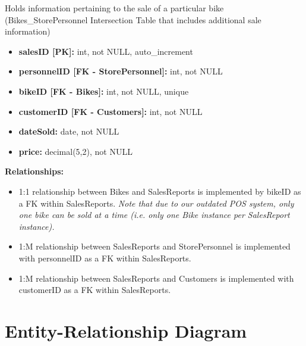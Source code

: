 \documentclass{article}
\begin{document}
\vspace{0.5cm}

\begin{tcolorbox}[colback=secondarycolor, colframe=primarycolor, title=\textbf{SalesReports Table}]
Holds information pertaining to the sale of a particular bike (Bikes\_StorePersonnel Intersection Table that includes additional sale information)
\vspace{0.2cm}

\begin{itemize}
  \item \textbf{salesID [PK]:} int, not NULL, auto\_increment
  \item \textbf{personnelID [FK - StorePersonnel]:} int, not NULL
  \item \textbf{bikeID [FK - Bikes]:} int, not NULL, unique
  \item \textbf{customerID [FK - Customers]:} int, not NULL
  \item \textbf{dateSold:} date, not NULL
  \item \textbf{price:} decimal(5,2), not NULL
\end{itemize}
\vspace{0.2cm}

\textbf{Relationships:}
\vspace{0.2cm}
\begin{itemize}
  \item 1:1 relationship between Bikes and SalesReports is implemented by bikeID as a FK within SalesReports. \textit{Note that due to our outdated POS system, only one bike can be sold at a time (i.e. only one Bike instance per SalesReport instance).}
  \item 1:M relationship between SalesReports and StorePersonnel is implemented with personnelID as a FK within SalesReports.
  \item 1:M relationship between SalesReports and Customers is implemented with customerID as a FK within SalesReports.
\end{itemize}
\end{tcolorbox}

\vspace{0.5cm}

\section{Entity-Relationship Diagram}
\end{document}
